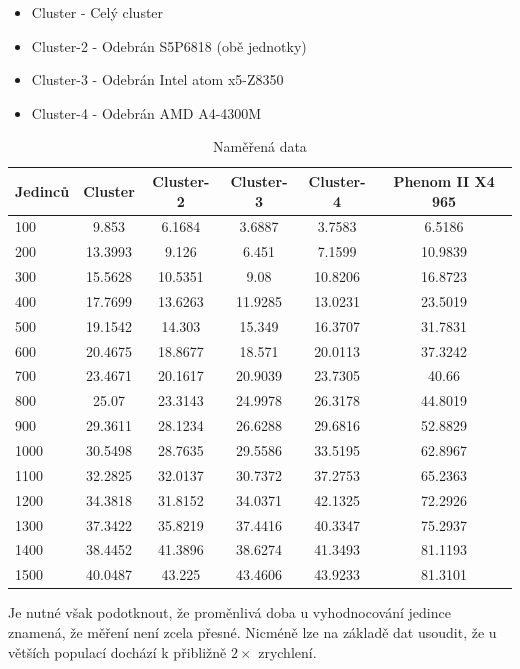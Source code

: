 \begin{itemize}
	\item Cluster - Celý cluster
	\item Cluster-2 - Odebrán S5P6818 (obě jednotky)
	\item Cluster-3 - Odebrán Intel atom x5-Z8350
	\item Cluster-4 - Odebrán AMD A4-4300M
\end{itemize}
\begin{table}[H]
	\begin{tabular}{|l|c|c|c|c|c|}
		\hline
		Jedinců & Cluster & Cluster-2 & Cluster-3 & Cluster-4 & Phenom II X4 965 \\
		\hline
		100     & 9.853   & 6.1684    & 3.6887    & 3.7583    & 6.5186           \\
		\hline
		200     & 13.3993 & 9.126     & 6.451     & 7.1599    & 10.9839          \\
		\hline
		300     & 15.5628 & 10.5351   & 9.08      & 10.8206   & 16.8723          \\
		\hline
		400     & 17.7699 & 13.6263   & 11.9285   & 13.0231   & 23.5019          \\
		\hline
		500     & 19.1542 & 14.303    & 15.349    & 16.3707   & 31.7831          \\
		\hline
		600     & 20.4675 & 18.8677   & 18.571    & 20.0113   & 37.3242          \\
		\hline
		700     & 23.4671 & 20.1617   & 20.9039   & 23.7305   & 40.66            \\
		\hline
		800     & 25.07   & 23.3143   & 24.9978   & 26.3178   & 44.8019          \\
		\hline
		900     & 29.3611 & 28.1234   & 26.6288   & 29.6816   & 52.8829          \\
		\hline
		1000    & 30.5498 & 28.7635   & 29.5586   & 33.5195   & 62.8967          \\
		\hline
		1100    & 32.2825 & 32.0137   & 30.7372   & 37.2753   & 65.2363          \\
		\hline
		1200    & 34.3818 & 31.8152   & 34.0371   & 42.1325   & 72.2926          \\
		\hline
		1300    & 37.3422 & 35.8219   & 37.4416   & 40.3347   & 75.2937          \\
		\hline
		1400    & 38.4452 & 41.3896   & 38.6274   & 41.3493   & 81.1193          \\
		\hline
		1500    & 40.0487 & 43.225    & 43.4606   & 43.9233   & 81.3101 \\    
		\hline     
	\end{tabular}
	\caption{Naměřená data}
	\label{tbl:benchmark}
\end{table}
Je nutné však podotknout, že proměnlivá doba u vyhodnocování jedince znamená, že měření není zcela přesné. Nicméně lze na základě dat usoudit, že u větších populací dochází k přibližně $2\times$ zrychlení.

